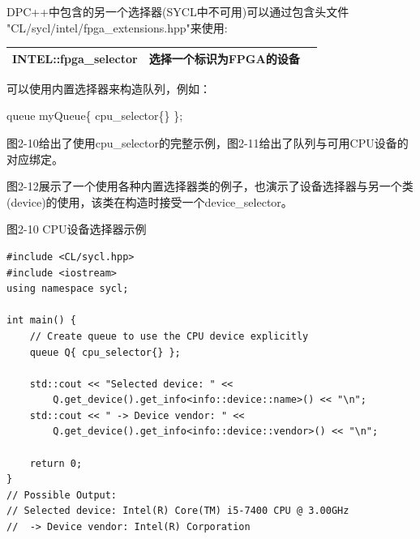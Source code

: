 \hspace*{\fill} \par %
DPC++中包含的另一个选择器(SYCL中不可用)可以通过包含头文件\\
"CL/sycl/intel/fpga\_extensions.hpp"来使用:

\hspace*{\fill} \par %
\begin{tabular}{lp{10cm}p{10cm}}
	\toprule  %
	\textbf{INTEL::fpga\_selector} & 选择一个标识为FPGA的设备\\
	\bottomrule %
\end{tabular}

\hspace*{\fill} \par %
可以使用内置选择器来构造队列，例如：\par

\begin{tcolorbox}[colback=green!5!white,colframe=green!75!black]
queue myQueue\{ cpu\_selector\{\} \};
\end{tcolorbox}

图2-10给出了使用cpu\_selector的完整示例，图2-11给出了队列与可用CPU设备的对应绑定。\par

图2-12展示了一个使用各种内置选择器类的例子，也演示了设备选择器与另一个类(device)的使用，该类在构造时接受一个device\_selector。\par

\hspace*{\fill} \par %
图2-10 CPU设备选择器示例
\begin{lstlisting}[caption={}]
#include <CL/sycl.hpp>
#include <iostream>
using namespace sycl;

int main() {
	// Create queue to use the CPU device explicitly
	queue Q{ cpu_selector{} };
	
	std::cout << "Selected device: " <<
		Q.get_device().get_info<info::device::name>() << "\n";
	std::cout << " -> Device vendor: " <<
		Q.get_device().get_info<info::device::vendor>() << "\n";
		
	return 0;
}
// Possible Output:
// Selected device: Intel(R) Core(TM) i5-7400 CPU @ 3.00GHz
//  -> Device vendor: Intel(R) Corporation
\end{lstlisting}

